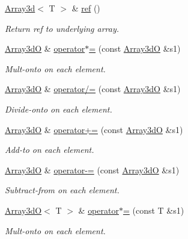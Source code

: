 \begin{DoxyCompactItemize}
\mbox{\hyperlink{classXMLArray_1_1Array3d}{Array3d}}$<$ T $>$ \& \mbox{\hyperlink{classADAT_1_1Array3dO_ad56a8ea2aac56eba9b8b74af06e79970}{ref}} ()
\begin{DoxyCompactList}\small\item\em Return ref to underlying array. \end{DoxyCompactList}\item 
\mbox{\hyperlink{classADAT_1_1Array3dO}{Array3dO}} \& \mbox{\hyperlink{classADAT_1_1Array3dO_a739c7272b271536ac15a00b5da43b6d6}{operator$\ast$=}} (const \mbox{\hyperlink{classADAT_1_1Array3dO}{Array3dO}} \&s1)
\begin{DoxyCompactList}\small\item\em Mult-\/onto on each element. \end{DoxyCompactList}\item 
\mbox{\hyperlink{classADAT_1_1Array3dO}{Array3dO}} \& \mbox{\hyperlink{classADAT_1_1Array3dO_a634dcf5154efc0a7496d50f4f258978d}{operator/=}} (const \mbox{\hyperlink{classADAT_1_1Array3dO}{Array3dO}} \&s1)
\begin{DoxyCompactList}\small\item\em Divide-\/onto on each element. \end{DoxyCompactList}\item 
\mbox{\hyperlink{classADAT_1_1Array3dO}{Array3dO}} \& \mbox{\hyperlink{classADAT_1_1Array3dO_a5d72c8e7dd54897fe898b07616123229}{operator+=}} (const \mbox{\hyperlink{classADAT_1_1Array3dO}{Array3dO}} \&s1)
\begin{DoxyCompactList}\small\item\em Add-\/to on each element. \end{DoxyCompactList}\item 
\mbox{\hyperlink{classADAT_1_1Array3dO}{Array3dO}} \& \mbox{\hyperlink{classADAT_1_1Array3dO_a5c840f5014264fdee101194d22f237e0}{operator-\/=}} (const \mbox{\hyperlink{classADAT_1_1Array3dO}{Array3dO}} \&s1)
\begin{DoxyCompactList}\small\item\em Subtract-\/from on each element. \end{DoxyCompactList}\item 
\mbox{\hyperlink{classADAT_1_1Array3dO}{Array3dO}}$<$ T $>$ \& \mbox{\hyperlink{classADAT_1_1Array3dO_acec17a674874030d454e516aad24f8a8}{operator$\ast$=}} (const T \&s1)
\begin{DoxyCompactList}\small\item\em Mult-\/onto on each element. \end{DoxyCompactList}\item 

\end{DoxyCompactItemize}

